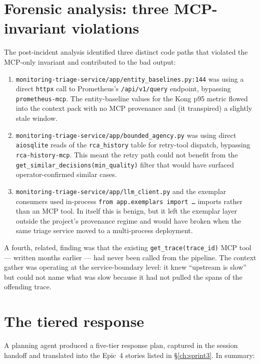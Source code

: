 \documentclass[11pt,a4paper,oneside]{report}
\begin{document}
\section{Forensic analysis: three MCP-invariant violations}

The post-incident analysis identified three distinct code paths that
violated the MCP-only invariant and contributed to the bad output:

\begin{enumerate}
  \item \texttt{monitoring-triage-service/app/entity\_baselines.py:144}
        was using a direct \texttt{httpx} call to Prometheus's
        \texttt{/api/v1/query} endpoint, bypassing
        \texttt{prometheus-mcp}.  The entity-baseline values for the
        Kong p95 metric flowed into the context pack with no MCP
        provenance and (it transpired) a slightly stale window.
  \item \texttt{monitoring-triage-service/app/bounded\_agency.py}
        was using direct \texttt{aiosqlite} reads of the
        \texttt{rca\_history} table for retry-tool dispatch,
        bypassing \texttt{rca-history-mcp}.  This meant the retry path
        could not benefit from the
        \texttt{get\_similar\_decisions(min\_quality)} filter that
        would have surfaced operator-confirmed similar cases.
  \item \texttt{monitoring-triage-service/app/llm\_client.py}
        and the exemplar consumers used in-process
        \texttt{from app.exemplars import \ldots} imports rather than an
        MCP tool.  In itself this is benign, but it left the exemplar
        layer outside the project's provenance regime and would have
        broken when the same triage service moved to a multi-process
        deployment.
\end{enumerate}

A fourth, related, finding was that the existing
\texttt{get\_trace(trace\_id)} MCP tool --- written months earlier ---
had never been called from the pipeline.  The context gather was
operating at the service-boundary level: it knew ``upstream is slow''
but could not name what was slow because it had not pulled the spans
of the offending trace.

\section{The tiered response}

A planning agent produced a five-tier response plan, captured in the
session handoff and translated into the Epic~4 stories listed in
\S\ref{ch:sprint3}.  In summary:
\end{document}
